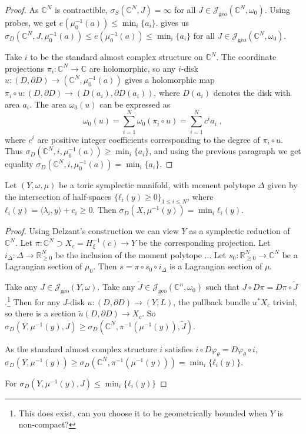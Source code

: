 \documentclass[12pt,a4paper,abstract=true,draft]{scrartcl}
\begin{document}
\begin{proof}
  As $ℂ^N$ is contractible, $σ_S(ℂ^N, J) = ∞$ for all $J ∈ 𝒥_\text{geo}(ℂ^N,ω_0)$. Using probes, we get $e(μ_0^{-1}(a)) ≤ \min_i\{a_i\}$.  gives us $σ_D(ℂ^N, J, μ_0^{-1}(a)) ≤ e(μ_0^{-1}(a)) ≤ \min_i\{a_i\}$ for all $J ∈ 𝒥_\text{geo}(ℂ^N,ω_0)$.

  Take $i$ to be the standard almost complex structure on $ℂ^N$.
  The coordinate projections $π_i \colon ℂ^N → ℂ$ are holomorphic, so any $i$-disk $u \colon (D,∂D) → (ℂ^N,μ_0^{-1}(a))$ gives a holomorphic map $π_i ∘ u\colon (D, ∂D) → (D(a_i), ∂D(a_i))$, where $D(a_i)$ denotes the disk with area $a_i$.
  The area $ω_0(u)$ can be expressed as
  \[ω_0(u) = ∑_{i=1}^N ω_0(π_i ∘ u) = ∑_{i=1}^N c^i a_i \; ,\]
  where $c^i$ are positive integer coefficients corresponding to the degree of $π_i ∘ u$.
  Thus $σ_D(ℂ^N, i, μ_0^{-1}(a)) ≥ \min_i\{a_i\}$, and using the previous paragraph we get equality $σ_D(ℂ^N, i, μ_0^{-1}(a)) = \min_i\{a_i\}$.
\end{proof}

\begin{lemma}
  Let $(Y,ω,μ)$ be a toric symplectic manifold, with moment polytope $Δ$ given by the intersection of half-spaces $\{ ℓ_i(y) ≥ 0\}_{1 ≤i ≤N}$, where $ℓ_i(y) = ⟨λ_i,y ⟩ + c_i ≥0$.
  Then $σ_D(X,μ^{-1}(y)) = \min_i{ℓ_i(y)}$.
\end{lemma}

\begin{proof}
  Using Delzant's construction we can view $Y$ as a symplectic reduction of $ℂ^N$.
  Let $π : ℂ^N ⊃ X_c = H_ξ^{-1}(c) → Y$ be the corresponding projection.
  Let $i_Δ \colon Δ → ℝ^N_{≥0}$ be the inclusion of the moment polytope ...
  Let $s_0 \colon ℝ^N_{≥0} → ℂ^N$ be a Lagrangian section of $μ_0$.
  Then $s = π ∘ s_0 ∘ i_Δ$ is a Lagrangian section of $μ$.

  Take any $J ∈ 𝒥_\text{geo}(Y,ω)$.
  Take any $\tilde{J} ∈ 𝒥_\text{geo}(ℂ^n,ω_0)$ such that $J ∘ Dπ = Dπ ∘ \tilde{J}$.\footnote{This does exist, can you choose it to be geometrically bounded when $Y$ is non-compact?}
  Then for any $J$-disk $u \colon (D,∂D) → (Y,L)$, the pullback bundle $u^* X_c$ trivial, so there is a section $\tilde{u} (D,∂D) → X_c$.
  So $σ_D(Y,μ^{-1}(y),J) ≥ σ_D(ℂ^N,π^{-1}(μ^{-1}(y)),\tilde{J})$.

  As the standard almost complex structure $i$ satisfies $i ∘ Dφ_θ = Dφ_θ ∘ i$, $σ_D(Y,μ^{-1}(y)) ≥ σ_D(ℂ^N,π^{-1}(μ^{-1}(y))) = \min_i\{ ℓ_i(y) \}$.

  For $σ_D(Y,μ^{-1}(y), J) ≤ \min_i\{ ℓ_i(y) \}$
\end{proof}
\end{document}
